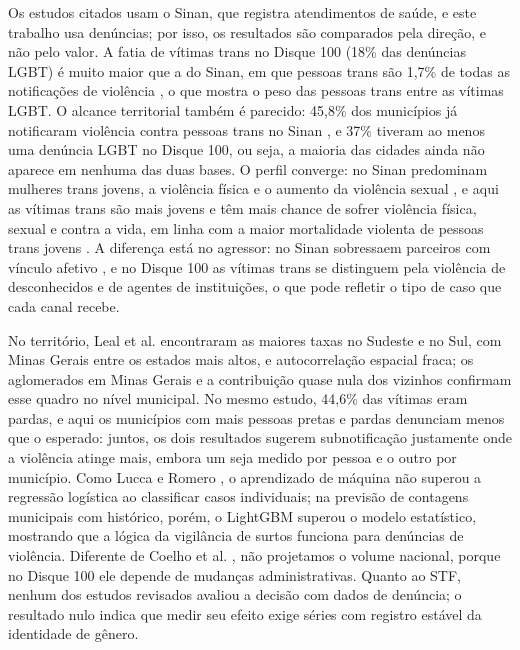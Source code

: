 \documentclass[12pt]{article}
\begin{document}
Os estudos citados usam o Sinan, que registra atendimentos de saúde, e este trabalho usa denúncias; por isso, os resultados são comparados pela direção, e não pelo valor. A fatia de vítimas trans no Disque 100 (18\% das denúncias LGBT) é muito maior que a do Sinan, em que pessoas trans são 1,7\% de todas as notificações de violência \cite{marinho_tomazelli_firianelli:2024}, o que mostra o peso das pessoas trans entre as vítimas LGBT. O alcance territorial também é parecido: 45,8\% dos municípios já notificaram violência contra pessoas trans no Sinan \cite{marinho_tomazelli_firianelli:2024}, e 37\% tiveram ao menos uma denúncia LGBT no Disque 100, ou seja, a maioria das cidades ainda não aparece em nenhuma das duas bases. O perfil converge: no Sinan predominam mulheres trans jovens, a violência física e o aumento da violência sexual \cite{leal_silva_lizzi:2026,marinho_tomazelli_firianelli:2024}, e aqui as vítimas trans são mais jovens e têm mais chance de sofrer violência física, sexual e contra a vida, em linha com a maior mortalidade violenta de pessoas trans jovens \cite{luis:2025}. A diferença está no agressor: no Sinan sobressaem parceiros com vínculo afetivo \cite{marinho_tomazelli_firianelli:2024}, e no Disque 100 as vítimas trans se distinguem pela violência de desconhecidos e de agentes de instituições, o que pode refletir o tipo de caso que cada canal recebe.

No território, Leal et al. \cite{leal_silva_lizzi:2026} encontraram as maiores taxas no Sudeste e no Sul, com Minas Gerais entre os estados mais altos, e autocorrelação espacial fraca; os aglomerados em Minas Gerais e a contribuição quase nula dos vizinhos confirmam esse quadro no nível municipal. No mesmo estudo, 44,6\% das vítimas eram pardas, e aqui os municípios com mais pessoas pretas e pardas denunciam menos que o esperado: juntos, os dois resultados sugerem subnotificação justamente onde a violência atinge mais, embora um seja medido por pessoa e o outro por município. Como Lucca e Romero \cite{lucca_romero_sbbd:2026}, o aprendizado de máquina não superou a regressão logística ao classificar casos individuais; na previsão de contagens municipais com histórico, porém, o LightGBM superou o modelo estatístico, mostrando que a lógica da vigilância de surtos \cite{held_hohle_hofmann:2005} funciona para denúncias de violência. Diferente de Coelho et al. \cite{coelho_jiv:2025}, não projetamos o volume nacional, porque no Disque 100 ele depende de mudanças administrativas. Quanto ao STF, nenhum dos estudos revisados avaliou a decisão com dados de denúncia; o resultado nulo indica que medir seu efeito exige séries com registro estável da identidade de gênero.
\end{document}

